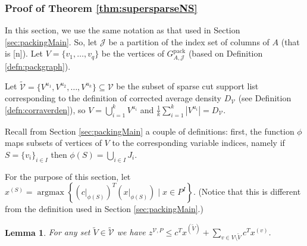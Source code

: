 \documentclass[smallextended]{svjour3}
\newtheorem{lemma}[proposition]{Lemma}
\begin{document}
\subsubsection{Proof of Theorem \ref{thm:supersparseNS}}
	
	In this section, we use the same notation as that used in Section \ref{sec:packingMain}. So, let ${\mathcal{J}}$ be a partition of the index set of columns of $A$ (that is [n]). Let $V = \{v_1, \ldots, v_q\}$ be the vertices of ${G^{\textrm{pack}}_{A, {\mathcal{J}}}}$ (based on Definition \ref{defn:packgraph}).
	
Let $\tilde{\mathcal{V}} = \{V^{u_1}, V^{u_2}, \dots, V^{u_k}\} \subseteq \mathcal{V}$ be the subset of sparse cut support list corresponding to the definition of corrected average density $D_{\mathcal{V}}$ (see Definition \ref{defn:corraverden}), so $V = \bigcup_{i = 1}^k V^{u_i}$ and $\frac{1}{k}\sum_{i = 1}^k |V^{u_i}| = D_{\mathcal{V}}$.

	Recall from Section \ref{sec:packingMain} a couple of definitions: first, the function $\phi$ maps subsets of vertices of $V$ to the corresponding variable indices, namely if $S = \{v_i\}_{i \in I}$ then $\phi(S) = \bigcup_{i \in I} J_i$. 
	
	
	
	
	For the purpose of this section, let $x^{(S)} = \operatorname{argmax}\left\{ (c|_{\phi(S)})^T (x|_{\phi(S)}) \mid x \in P^I\right\}$. (Notice that this is different from the definition used in Section \ref{sec:packingMain}.)
	
		\begin{lemma} \label{lemma:genPacking}
		For any set $\tilde{V} \in \tilde{\mathcal{V}}$ we have $z^{\mathcal{V}, P} \leq c^T x^{(\tilde{V})} + \sum_{v \in V \setminus \tilde{V}} c^T x^{(v)}$.
		
	\end{lemma}
	
\end{document}
